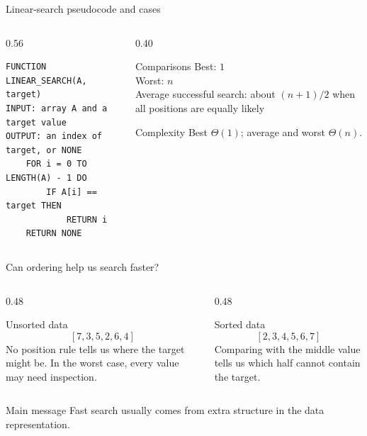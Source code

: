 \documentclass[aspectratio=169]{beamer}
\begin{document}
\begin{frame}[fragile]{Linear-search pseudocode and cases}
  \begin{columns}[T]
    \begin{column}{0.56\textwidth}
\begin{lstlisting}[style=pseudonumbered]
FUNCTION LINEAR_SEARCH(A, target)
INPUT: array A and a target value
OUTPUT: an index of target, or NONE
    FOR i = 0 TO LENGTH(A) - 1 DO
        IF A[i] == target THEN
            RETURN i
    RETURN NONE
\end{lstlisting}
    \end{column}
    \begin{column}{0.40\textwidth}
      \begin{block}{Comparisons}
        Best: $1$\\
        Worst: $n$\\
        Average successful search: about $(n+1)/2$ when all positions are equally likely
      \end{block}
      \begin{exampleblock}{Complexity}
        Best $\Theta(1)$; average and worst $\Theta(n)$.
      \end{exampleblock}
    \end{column}
  \end{columns}
\end{frame}


\begin{frame}{Can ordering help us search faster?}
  \small
  \begin{columns}[T]
    \begin{column}{0.48\textwidth}
      \begin{alertblock}{Unsorted data}
        \[
          [7,3,5,2,6,4]
        \]
        No position rule tells us where the target might be. In the worst case,
        every value may need inspection.
      \end{alertblock}
    \end{column}
    \begin{column}{0.48\textwidth}
      \begin{exampleblock}{Sorted data}
        \[
          [2,3,4,5,6,7]
        \]
        Comparing with the middle value tells us which half cannot contain the
        target.
      \end{exampleblock}
    \end{column}
  \end{columns}
  \begin{block}{Main message}
    Fast search usually comes from extra structure in the data representation.
  \end{block}
\end{frame}
\end{document}
